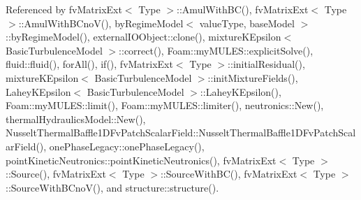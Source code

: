 Referenced by fv\+Matrix\+Ext$<$ Type $>$\+::\+Amul\+With\+B\+C(), fv\+Matrix\+Ext$<$ Type $>$\+::\+Amul\+With\+B\+Cno\+V(), by\+Regime\+Model$<$ value\+Type, base\+Model $>$\+::by\+Regime\+Model(), external\+I\+O\+Object\+::clone(), mixture\+K\+Epsilon$<$ Basic\+Turbulence\+Model $>$\+::correct(), Foam\+::my\+M\+U\+L\+E\+S\+::explicit\+Solve(), fluid\+::fluid(), for\+All(), if(), fv\+Matrix\+Ext$<$ Type $>$\+::initial\+Residual(), mixture\+K\+Epsilon$<$ Basic\+Turbulence\+Model $>$\+::init\+Mixture\+Fields(), Lahey\+K\+Epsilon$<$ Basic\+Turbulence\+Model $>$\+::\+Lahey\+K\+Epsilon(), Foam\+::my\+M\+U\+L\+E\+S\+::limit(), Foam\+::my\+M\+U\+L\+E\+S\+::limiter(), neutronics\+::\+New(), thermal\+Hydraulics\+Model\+::\+New(), Nusselt\+Thermal\+Baffle1\+D\+Fv\+Patch\+Scalar\+Field\+::\+Nusselt\+Thermal\+Baffle1\+D\+Fv\+Patch\+Scalar\+Field(), one\+Phase\+Legacy\+::one\+Phase\+Legacy(), point\+Kinetic\+Neutronics\+::point\+Kinetic\+Neutronics(), fv\+Matrix\+Ext$<$ Type $>$\+::\+Source(), fv\+Matrix\+Ext$<$ Type $>$\+::\+Source\+With\+B\+C(), fv\+Matrix\+Ext$<$ Type $>$\+::\+Source\+With\+B\+Cno\+V(), and structure\+::structure().

